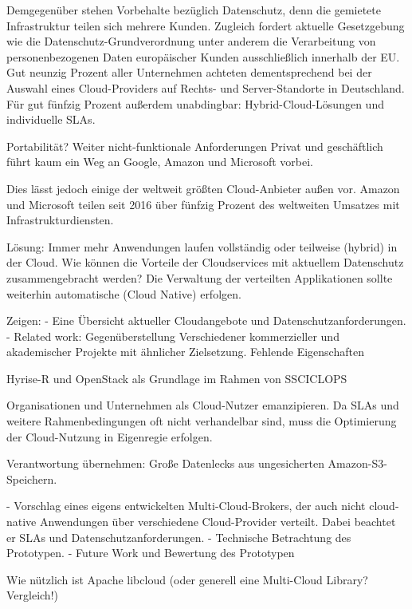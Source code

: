 Demgegenüber stehen Vorbehalte bezüglich Datenschutz, denn die gemietete Infrastruktur teilen sich mehrere Kunden. Zugleich fordert aktuelle Gesetzgebung wie die Datenschutz-Grundverordnung unter anderem die Verarbeitung von personenbezogenen Daten europäischer Kunden ausschließlich innerhalb der EU. %
Gut neunzig Prozent aller Unternehmen achteten dementsprechend bei der Auswahl eines Cloud-Providers auf Rechts- und Server-Standorte in Deutschland. Für gut fünfzig Prozent außerdem unabdingbar: Hybrid-Cloud-Lösungen und individuelle SLAs.

Portabilität? Weiter nicht-funktionale Anforderungen
Privat und geschäftlich führt kaum ein Weg an Google, Amazon und Microsoft vorbei. 


Dies lässt jedoch einige der weltweit größten Cloud-Anbieter außen vor. Amazon und Microsoft teilen seit 2016 über fünfzig Prozent des weltweiten Umsatzes mit Infrastrukturdiensten. %

Lösung: Immer mehr Anwendungen laufen vollständig oder teilweise (hybrid) in der Cloud. Wie können die Vorteile der Cloudservices mit aktuellem Datenschutz zusammengebracht werden? Die Verwaltung der verteilten Applikationen sollte weiterhin automatische (Cloud Native) erfolgen.

Zeigen: 
- Eine Übersicht aktueller Cloudangebote und Datenschutzanforderungen.
- Related work: Gegenüberstellung Verschiedener kommerzieller und akademischer Projekte mit ähnlicher Zielsetzung. Fehlende Eigenschaften

Hyrise-R und OpenStack als Grundlage im Rahmen von SSCICLOPS

Organisationen und Unternehmen als Cloud-Nutzer emanzipieren. Da SLAs und weitere Rahmenbedingungen oft nicht verhandelbar sind, muss die Optimierung der Cloud-Nutzung in Eigenregie erfolgen.

Verantwortung übernehmen: Große Datenlecks aus ungesicherten Amazon-S3-Speichern.

- Vorschlag eines eigens entwickelten Multi-Cloud-Brokers, der auch nicht cloud-native Anwendungen über verschiedene Cloud-Provider verteilt. Dabei beachtet er SLAs und Datenschutzanforderungen.
- Technische Betrachtung des Prototypen.
- Future Work und Bewertung des Prototypen

Wie nützlich ist Apache libcloud (oder generell eine Multi-Cloud Library? Vergleich!)